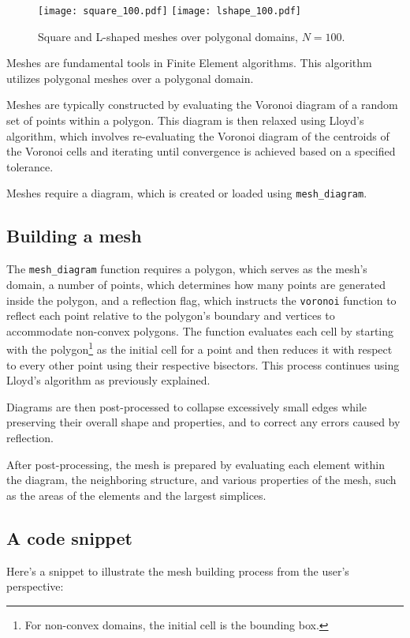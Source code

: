 \begin{figure}[!ht]
	\centering
	\texttt{[image: square\_100.pdf]}
    \texttt{[image: lshape\_100.pdf]}
	\caption{Square and L-shaped meshes over polygonal domains, $N = 100$.}
\end{figure}

Meshes are fundamental tools in Finite Element algorithms. This algorithm utilizes polygonal meshes over a polygonal domain.

\cite{Talischi2012} Meshes are typically constructed by evaluating the Voronoi diagram of a random set of points within a polygon. This diagram is then relaxed using Lloyd's algorithm, which involves re-evaluating the Voronoi diagram of the centroids of the Voronoi cells and iterating until convergence is achieved based on a specified tolerance.

Meshes require a diagram, which is created or loaded using \lstinline{mesh_diagram}.

\subsection{Building a mesh}

The \lstinline{mesh_diagram} function requires a polygon, which serves as the mesh's domain, a number of points, which determines how many points are generated inside the polygon, and a reflection flag, which instructs the \lstinline{voronoi} function to reflect each point relative to the polygon's boundary and vertices to accommodate non-convex polygons. The function evaluates each cell by starting with the polygon\footnote{For non-convex domains, the initial cell is the bounding box.} as the initial cell for a point and then reduces it with respect to every other point using their respective bisectors. This process continues using Lloyd's algorithm as previously explained.

Diagrams are then post-processed to collapse excessively small edges while preserving their overall shape and properties, and to correct any errors caused by reflection.

After post-processing, the mesh is prepared by evaluating each element within the diagram, the neighboring structure, and various properties of the mesh, such as the areas of the elements and the largest simplices.

\newpage
\subsection{A code snippet}

Here's a snippet to illustrate the mesh building process from the user's perspective:

